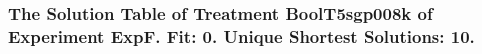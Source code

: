  \begin{frame}
 \fontsize{8pt}{9pt}\selectfont
 \frametitle{ The Solution Table of Treatment BoolT5sgp008k of Experiment ExpF. Fit: 0. Unique Shortest Solutions: 10. }

 \label{ExpFSolutionTable006.tex}  
 \end{frame}

